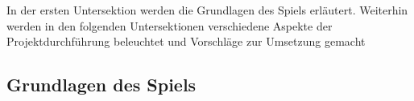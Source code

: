 \documentclass[a4paper,12pt]{article}
\begin{document}
    In der ersten Untersektion werden die Grundlagen des Spiels erläutert.
    Weiterhin werden in den folgenden Untersektionen verschiedene 
    Aspekte der Projektdurchführung beleuchtet und Vorschläge zur Umsetzung gemacht


\subsection{Grundlagen des Spiels}

\end{document}
